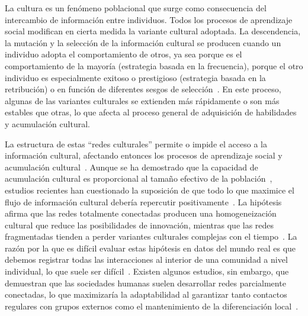 \documentclass[a4paper,11pt]{book}
\theoremstyle{definition}
\begin{document}

La cultura es un fen\'omeno poblacional que surge como consecuencia del intercambio de informaci\'on entre individuos.
%
Todos los procesos de aprendizaje social modifican en cierta medida la variante cultural adoptada.
%
La descendencia, la mutaci\'on y la selecci\'on de la informaci\'on cultural se producen cuando un individuo adopta el comportamiento de otros, ya sea porque es el comportamiento de la mayor\'ia (estrategia basada en la frecuencia), porque el otro individuo es especialmente exitoso o prestigioso (estrategia basada en la retribuci\'on) o en funci\'on de diferentes sesgos de selecci\'on~\cite{muthukrishna2016-whenAndWhoSocialLearning,rendell2011-cognitiveCulture}.
%
En este proceso, algunas de las variantes culturales se extienden m\'as r\'apidamente o son m\'as estables que otras, lo que afecta al proceso general de adquisici\'on de habilidades y acumulaci\'on cultural.


La estructura de estas ``redes culturales'' permite o impide el acceso a la informaci\'on cultural, afectando entonces los procesos de aprendizaje social y acumulaci\'on cultural~\cite{Derex2020}.
%
Aunque se ha demostrado que la capacidad de acumulaci\'on cultural es proporcional al tama\~no efectivo de la poblaci\'on~\cite{shennan2001-demographyAndCulture, Henrich2004, kempe2014-experiment}, estudios recientes han cuestionado la suposici\'on de que todo lo que maximice el flujo de informaci\'on cultural deber\'ia repercutir positivamente~\cite{Derex2020}.
%
La hip\'otesis afirma que las redes totalmente conectadas producen una homogeneizaci\'on cultural que reduce las posibilidades de innovaci\'on, mientras que las redes fragmentadas tienden a perder variantes culturales complejas con el tiempo~\cite{derex2018-divideAndConquer,Creanza2017}.
%
La raz\'on por la que es dif\'icil evaluar estas hip\'otesis en datos del mundo real es que debemos registrar todas las interacciones al interior de una comunidad a nivel individual, lo que suele ser dif\'icil~\cite{Derex2020}.
%
Existen algunos estudios, sin embargo, que demuestran que las sociedades humanas suelen desarrollar redes parcialmente conectadas, lo que maximizar\'ia la adaptabilidad al garantizar tanto contactos regulares con grupos externos como el mantenimiento de la diferenciaci\'on local~\cite{padilla2022-interconnectivity,migliano2017-hunterGathererNetwork}.

\end{document}
